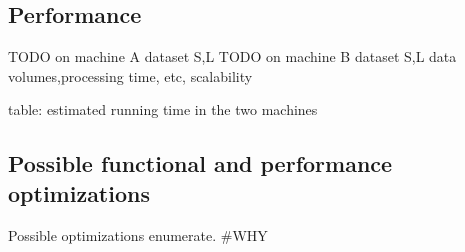 \subsection{Performance}
TODO on machine A dataset S,L
TODO on machine B dataset S,L
	data volumes,processing time, etc, scalability

table: estimated running time in the two machines
\subsection{Possible functional and performance optimizations}
Possible optimizations enumerate.
\#WHY